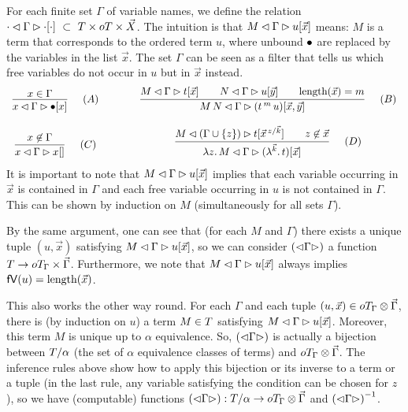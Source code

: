 \documentclass[submission,copyright,creativecommons]{eptcs}
\begin{document}
For each finite %
set $\Gamma$ of variable names, we define the relation
${\cdot \lhd \Gamma \rhd \cdot[\cdot]} ~ \subset ~ T \times oT \times \vec {X}$.
The intuition is that ${M \lhd \Gamma \rhd u[\vec x]}$ means: 
$M$ is a term that corresponds to the ordered term $u$, where unbound $\mathord{\bullet}$ are replaced by the variables in the list $\vec x$. 
The set $\Gamma$ can be seen as a filter that tells us which free variables do not occur in $u$ but in $\vec x$ instead.
\[
\begin{array}{c@{\qquad\qquad} c}
\infnamed{\quad (A)}{x \in \Gamma}{\parseb x \Gamma \ovar x}
&
\infnamed{\quad (B)}{ {\parseb M \Gamma t {\vec x}} \qquad 
        {\parseb N \Gamma u {\vec y}} \qquad {\length{\vec x} = m} } 
      {\parseb {M\,N} {\Gamma} {(\ApO t m u)}  {\vec x, \vec y} } 
\\ \\
\infnamed{\quad (C)}{x \not\in \Gamma}{\parseb x \Gamma x {}}
&
\infnamed{\quad (D)}{ 
         {\parseb M { (\Gamma \cup \{z\}) }  t {\multiinsert{\vec x}{\vec k}{z}   }} 
          \qquad 
          z \not\in \vec x  }
          {\parseb {\LaA z M} {\Gamma} {(\LaO {\vec{k}} t)} {\vec x}}
\end{array}
\]
It is important to note that ${M \lhd \Gamma \rhd u[\vec x]}$ implies that each variable occurring in $\vec x$ is contained in $\Gamma$ and each free variable occurring in $u$ is not contained in $\Gamma$. This can be shown by induction on $M$ (simultaneously for all sets $\Gamma$). 

By the same argument, one can see that (for each $M$ and $\Gamma$) there exists a unique tuple $(u, \vec x)$ satisfying ${M \lhd \Gamma \rhd u[\vec x]}$, so we can consider ${\left(\mathord{\lhd} {\Gamma} \mathord{\rhd}\right)}$ a function $T \rightarrow oT_\Gamma \times \vec \Gamma$. Furthermore, we note that ${M \lhd \Gamma \rhd u[\vec x]}$ always implies $\mathsf{fV}(u) = \mbox{length}(\vec x)$. 
 
This also works the other way round. For each $\Gamma$ and each tuple $(u, \vec x) \in oT_\Gamma \otimes \vec \Gamma$, there is (by induction on $u$) a term $M \in T$ satisfying ${M \lhd \Gamma \rhd u[\vec x]}$. Moreover, this term $M$ is unique up to $\alpha$ equivalence. So, ${\left(\mathord{\lhd} {\Gamma} \mathord{\rhd}\right)}$ is actually a bijection between $T / \alpha$ (the set of $\alpha$ equivalence classes of terms) and $oT_\Gamma \otimes \vec \Gamma$. The inference rules above show how to apply this bijection or its inverse to a term or a tuple (in the last rule, any variable satisfying the condition can be chosen for $z$), so we have (computable) functions ${\left(\mathord{\lhd} {\Gamma} \mathord{\rhd}\right)} : T / \alpha \rightarrow oT_\Gamma \otimes \vec \Gamma$ and ${\left(\mathord{\lhd} {\Gamma} \mathord{\rhd}\right)} ^{-1}$. 
\end{document}
